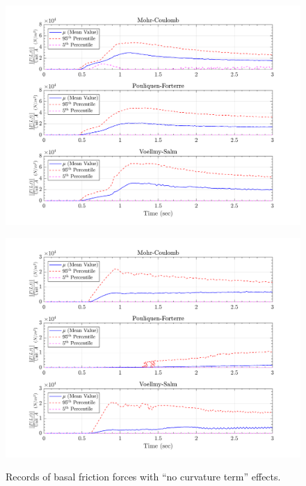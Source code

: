 \documentclass{article}
\begin{document}
\begin{figure}[H]
	\begin{minipage}[b]{0.5\linewidth}
    	\centering
    	\includegraphics[width=1\textwidth]{InclinedPlane/LocalRecords/Records/Fb_L15.png}
    	\label{fig:Ramp-L3-Fb}
	\end{minipage}
	\begin{minipage}[b]{0.5\linewidth}
		\centering
		\includegraphics[width=1\textwidth]{InclinedPlane/LocalRecords/Records/Fb_L17.png}
    	\label{fig:Ramp-L4-Fb}
    \end{minipage}
    \caption{Records of basal friction forces with ``no curvature term'' effects.}
    \label{fig:Ramp-LM-Fb}
\end{figure}
\end{document}
